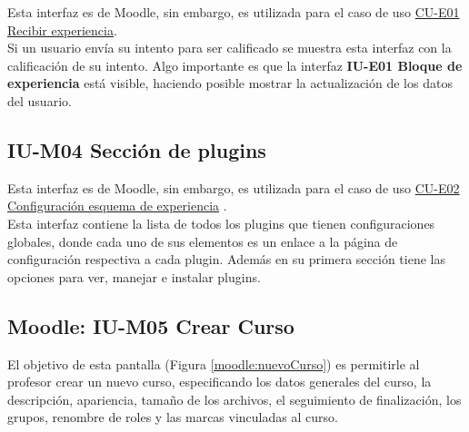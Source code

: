     Esta interfaz es de Moodle, sin embargo, es utilizada para el caso de uso   \hyperref[CU-E01]{CU-E01 Recibir experiencia}.\\
    
    \noindent Si un usuario envía su intento para ser calificado 
    se muestra esta interfaz con la calificación de su intento. Algo importante es que la interfaz  \textbf{IU-E01 Bloque de experiencia} está visible, haciendo posible mostrar la actualización de los datos del usuario.\\

    
    
	\clearpage

\subsection*{IU-M04 Sección de plugins}
\label{IUM04}

    Esta interfaz es de Moodle, sin embargo, es utilizada para el caso de uso \hyperref[CU-E02]{CU-E02 Configuración esquema de experiencia} .\\
    
    \noindent Esta interfaz contiene la lista de todos los plugins que tienen configuraciones globales, donde cada uno de sus elementos es un enlace a la página de configuración respectiva a cada plugin. Además en su primera sección tiene las opciones para ver, manejar e instalar plugins.\\

	\clearpage
	

\subsection*{Moodle: IU-M05 Crear Curso}

 El objetivo de esta pantalla (Figura \ref{moodle:nuevoCurso}) es permitirle al profesor crear un nuevo curso, especificando los datos generales del curso, la descripción, apariencia, tamaño de los archivos, el seguimiento de finalización, los grupos, renombre de roles y las marcas vinculadas al curso.
    
    
